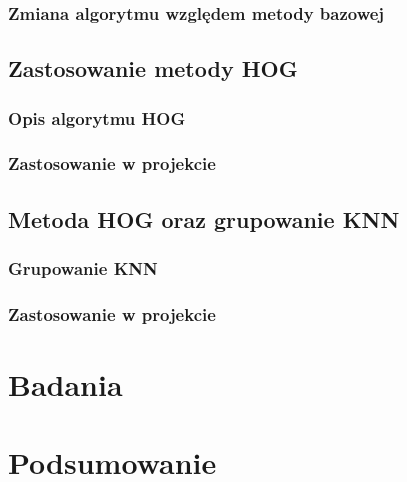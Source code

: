 \subsection{Zmiana algorytmu względem metody bazowej}

\section{Zastosowanie metody HOG}
\subsection{Opis algorytmu HOG}
\subsection{Zastosowanie w projekcie}

\section{Metoda HOG oraz grupowanie KNN}
\subsection{Grupowanie KNN}
\subsection{Zastosowanie w projekcie}
\chapter{Badania}

\chapter{Podsumowanie}







